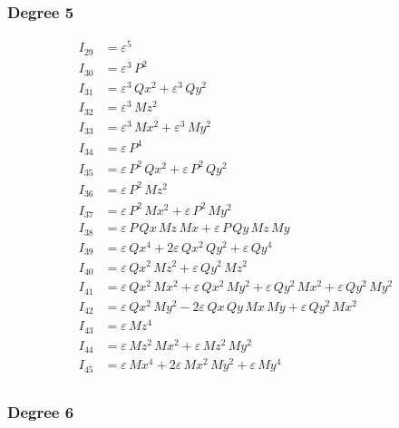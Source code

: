 \documentclass{article}
\begin{document}
\subsubsection*{Degree 5}

\begin{align*}
I_{29} &= ε^{5} \\
I_{30} &= ε^{3}\,P^{2} \\
I_{31} &= ε^{3}\,Qx^{2} + ε^{3}\,Qy^{2} \\
I_{32} &= ε^{3}\,Mz^{2} \\
I_{33} &= ε^{3}\,Mx^{2} + ε^{3}\,My^{2} \\
I_{34} &= ε\,P^{4} \\
I_{35} &= ε\,P^{2}\,Qx^{2} + ε\,P^{2}\,Qy^{2} \\
I_{36} &= ε\,P^{2}\,Mz^{2} \\
I_{37} &= ε\,P^{2}\,Mx^{2} + ε\,P^{2}\,My^{2} \\
I_{38} &= ε\,P\,Qx\,Mz\,Mx + ε\,P\,Qy\,Mz\,My \\
I_{39} &= ε\,Qx^{4} + 2ε\,Qx^{2}\,Qy^{2} + ε\,Qy^{4} \\
I_{40} &= ε\,Qx^{2}\,Mz^{2} + ε\,Qy^{2}\,Mz^{2} \\
I_{41} &= ε\,Qx^{2}\,Mx^{2} + ε\,Qx^{2}\,My^{2} + ε\,Qy^{2}\,Mx^{2} + ε\,Qy^{2}\,My^{2} \\
I_{42} &= ε\,Qx^{2}\,My^{2} - 2ε\,Qx\,Qy\,Mx\,My + ε\,Qy^{2}\,Mx^{2} \\
I_{43} &= ε\,Mz^{4} \\
I_{44} &= ε\,Mz^{2}\,Mx^{2} + ε\,Mz^{2}\,My^{2} \\
I_{45} &= ε\,Mx^{4} + 2ε\,Mx^{2}\,My^{2} + ε\,My^{4} \\
\end{align*}

\subsubsection*{Degree 6}
\end{document}
